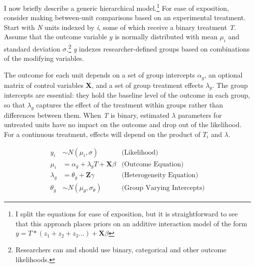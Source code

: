 \documentclass[12pt]{article}
\begin{document}
I now briefly describe a generic hierarchical model.\footnote{I split the equations for ease of exposition, but it is straightforward to see that this approach places priors on an additive interaction model of the form $y = T * (z_1 + z_2 + z_3 ...) + \textbf{X} \beta$}
For ease of exposition, consider making between-unit comparisons based on an experimental treatment.    
Start with \textit{N} units indexed by \textit{i}, some of which receive a binary treatment \textit{T}.
Assume that the outcome variable ${y}$ is normally distributed with mean $\mu_i$ and standard deviation $\sigma$.\footnote{Researchers can and should use binary, categorical and other outcome likelihoods.}
\textit{g} indexes researcher-defined groups based on combinations of the modifying variables.


The outcome for each unit depends on a set of group intercepts $\alpha_g$, an optional matrix of control variables \textbf{X}, and a set of group treatment effects $\lambda_g$.
The group intercepts are essential: they hold the baseline level of the outcome in each group, so that $\lambda_g$ captures the effect of the treatment within groups rather than differences between them.
When \textit{T} is binary, estimated $\lambda$ parameters for untreated units have no impact on the outcome and drop out of the likelihood.
For a continuous treatment, effects will depend on the product of $\textit{T}_i$ and $\lambda$.



\begin{align*}
y_i &\sim N(\mu_i, \sigma) &\text{(Likelihood)} \\
\mu_i &= \alpha_g + \lambda_g \textit{T} + \textbf{X} \beta &\text{(Outcome Equation)}  \\ 
\lambda_g &= \theta_g + \textbf{Z} \gamma  &\text{(Heterogeneity Equation)}\\
\theta_g &\sim N(\mu_\theta, \sigma_\theta) &\text{(Group Varying Intercepts)} 
\end{align*}



\end{document}
